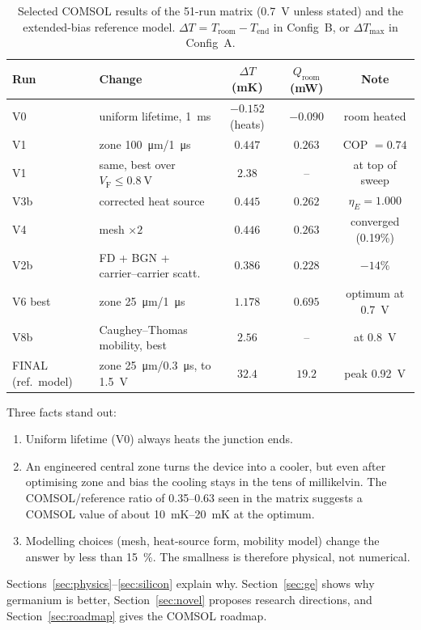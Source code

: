 \documentclass[11pt,a4paper]{article}
\newcommand{\VF}{V_{\mathrm{F}}}
\newcommand{\Troom}{T_{\mathrm{room}}}
\begin{document}
\begin{table}[h]
\centering\footnotesize
\caption{Selected COMSOL results of the 51-run matrix (\SI{0.7}{\volt} unless stated) and the extended-bias reference model. $\Delta T$ = $\Troom-T_{\mathrm{end}}$ in Config~B, or $\Delta T_{\max}$ in Config~A.}
\label{tab:matrix}
\setlength{\tabcolsep}{4pt}
\begin{tabular}{llccc}
\toprule
Run & Change & $\Delta T$ (mK) & $Q_{\mathrm{room}}$ (mW) & Note\\
\midrule
V0 & uniform lifetime, \SI{1}{\milli\second} & $-0.152$ (heats) & $-0.090$ & room heated\\
V1 & zone \SI{100}{\micro\metre}/\SI{1}{\micro\second} & $0.447$ & $0.263$ & COP $=0.74$\\
V1 & same, best over $\VF\le\SI{0.8}{\volt}$ & $2.38$ & -- & at top of sweep\\
V3b & corrected heat source & $0.445$ & $0.262$ & $\eta_E=1.000$\\
V4 & mesh $\times2$ & $0.446$ & $0.263$ & converged (0.19\%)\\
V2b & FD + BGN + carrier--carrier scatt. & $0.386$ & $0.228$ & $-14\%$\\
V6 best & zone \SI{25}{\micro\metre}/\SI{1}{\micro\second} & $1.178$ & $0.695$ & optimum at \SI{0.7}{\volt}\\
V8b & Caughey--Thomas mobility, best & $2.56$ & -- & at \SI{0.8}{\volt}\\
\midrule
FINAL (ref.\ model) & zone \SI{25}{\micro\metre}/\SI{0.3}{\micro\second}, to \SI{1.5}{\volt} & $32.4$ & $19.2$ & peak \SI{0.92}{\volt}\\
\bottomrule
\end{tabular}
\end{table}

\noindent Three facts stand out:
\begin{enumerate}
  \item Uniform lifetime (V0) always heats the junction ends.
  \item An engineered central zone turns the device into a cooler, but even after optimising zone and bias the cooling stays in the tens of millikelvin. The COMSOL/reference ratio of 0.35--0.63 seen in the matrix suggests a COMSOL value of about \SIrange{10}{20}{\milli\kelvin} at the optimum.
  \item Modelling choices (mesh, heat-source form, mobility model) change the answer by less than \SI{15}{\percent}. The smallness is therefore physical, not numerical.
\end{enumerate}
Sections~\ref{sec:physics}--\ref{sec:silicon} explain why. Section~\ref{sec:ge} shows why germanium is better, Section~\ref{sec:novel} proposes research directions, and Section~\ref{sec:roadmap} gives the COMSOL roadmap.
\end{document}
